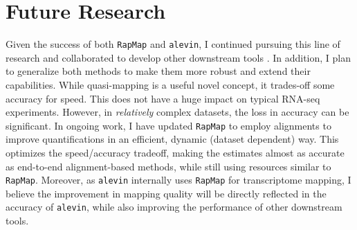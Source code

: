 \documentclass[11pt,a4paper,sans]{moderncv} %
\newcommand{\qm}{quasi-mapping\xspace}
\newcommand{\rapmap}{\texttt{RapMap}\xspace}
\newcommand{\alevin}{\texttt{alevin}\xspace}
\begin{document}
\section{Future Research}
Given the success of both \rapmap and \alevin, I continued pursuing this line of research and collaborated to develop other downstream tools \cite{rapclust, ddfact, pufferfish, swish, minnow}. 
In addition, I plan to generalize both methods to make them more robust and extend their capabilities. 
While \qm is a useful novel concept, it trades-off some accuracy for speed. This does not have a huge
impact on typical RNA-seq experiments. However, in \textit{relatively} complex datasets, the loss in accuracy can be significant. In ongoing work, I have updated \rapmap to employ alignments to improve 
quantifications in an efficient, dynamic (dataset dependent) way. This optimizes the
speed/accuracy tradeoff, making the estimates almost as accurate as end-to-end alignment-based
methods, while still using resources similar to \rapmap. Moreover, as \alevin internally uses \rapmap for transcriptome mapping, I believe the improvement in mapping quality will be directly reflected in 
the accuracy of \alevin, while also improving the performance of other downstream tools.
\end{document}

